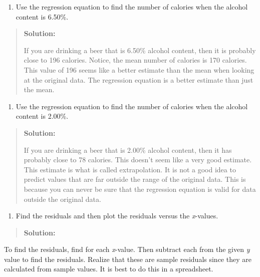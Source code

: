 \documentclass[]{book}
\providecommand{\tightlist}{%
  \setlength{\itemsep}{0pt}\setlength{\parskip}{0pt}}
\begin{document}
\begin{enumerate}
\def\labelenumi{\alph{enumi}.}
\setcounter{enumi}{1}
\tightlist
\item
  Use the regression equation to find the number of calories when the alcohol content is 6.50\%.
\end{enumerate}

\begin{quote}
\textbf{Solution:}

If you are drinking a beer that is 6.50\% alcohol content, then it is probably close to 196 calories. Notice, the mean number of calories is 170 calories. This value of 196 seems like a better estimate than the mean when looking at the original data. The regression equation is a better estimate than just the mean.
\end{quote}

\begin{enumerate}
\def\labelenumi{\alph{enumi}.}
\setcounter{enumi}{2}
\tightlist
\item
  Use the regression equation to find the number of calories when the alcohol content is 2.00\%.
\end{enumerate}

\begin{quote}
\textbf{Solution:}

If you are drinking a beer that is 2.00\% alcohol content, then it has probably close to 78 calories. This doesn't seem like a very good estimate. This estimate is what is called extrapolation. It is not a good idea to predict values that are far outside the range of the original data. This is because you can never be sure that the regression equation is valid for data outside the original data.
\end{quote}

\begin{enumerate}
\def\labelenumi{\alph{enumi}.}
\setcounter{enumi}{3}
\tightlist
\item
  Find the residuals and then plot the residuals versus the \emph{x}-values.
\end{enumerate}

\begin{quote}
\textbf{Solution:}
\end{quote}

To find the residuals, find for each \emph{x}-value. Then subtract each from the given \emph{y} value to find the residuals. Realize that these are sample residuals since they are calculated from sample values. It is best to do this in a spreadsheet.
\end{document}
